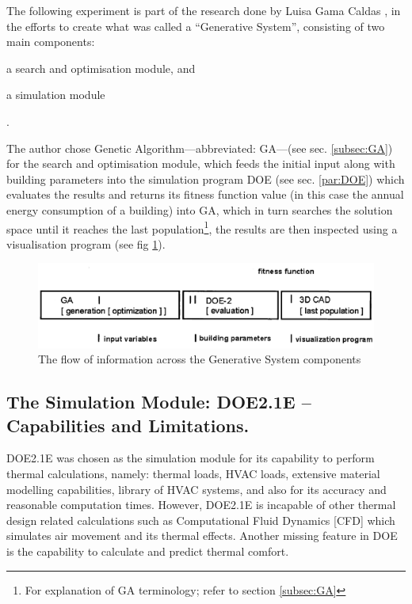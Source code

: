 The following experiment is part of the research done by Luisa Gama Caldas \cite{caldas01}, in the efforts to create what was called a ``Generative System'', consisting of two main components: \begin{inparaenum} \item a search and optimisation module, and \item a simulation module \end{inparaenum}.

The author chose Genetic Algorithm---abbreviated: GA---(see sec. \ref{subsec:GA}) for the search and optimisation module, which feeds the initial input along with building parameters into the simulation program DOE (see sec. \ref{par:DOE}) which evaluates the results and returns its fitness function value (in this case the annual energy consumption of a building) into GA, which in turn searches the solution space until it reaches the last population\footnote{For explanation of GA terminology; refer to section \ref{subsec:GA}}, the results are then inspected using a visualisation program (see fig \ref{fig:GSfitFun}).

\begin{figure}[htbp]
\centering
\includegraphics[width=\textwidth]{./Images/15-FitnessFunction}
\caption[GS Information Flow]{The flow of information across the Generative System components \cite{caldas01}}
\label{fig:GSfitFun}
\end{figure}

\subsection{The Simulation Module: DOE2.1E -- Capabilities and Limitations.}
DOE2.1E was chosen as the simulation module for its capability to perform thermal calculations, namely: thermal loads, HVAC loads, extensive material modelling capabilities, library of HVAC systems, and also for its accuracy and reasonable computation times. However, DOE2.1E is incapable of other thermal design related calculations such as Computational Fluid Dynamics [CFD] which simulates air movement and its thermal effects. Another missing feature in DOE is the capability to calculate and predict thermal comfort. 

